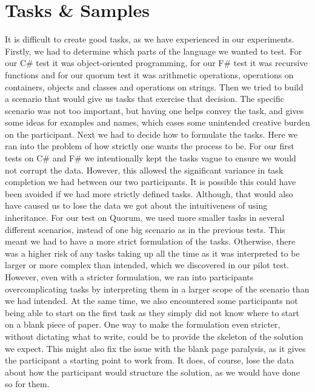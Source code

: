 \section{Tasks \& Samples}
\label{Discussion:TaskSamples}
It is difficult to create good tasks, as we have experienced in our experiments.
Firstly, we had to determine which parts of the language we wanted to test.
For our C\# test it was object-oriented programming, for our F\# test it was recursive functions and for our quorum test it was arithmetic operations, operations on containers, objects and classes and operations on strings.
Then we tried to build a scenario that would give us tasks that exercise that decision.
The specific scenario was not too important, but having one helps convey the task, and gives some ideas for examples and names, which eases some unintended creative burden on the participant.
Next we had to decide how to formulate the tasks.
Here we ran into the problem of how strictly one wants the process to be.
For our first tests on C\# and F\# we intentionally kept the tasks vague to ensure we would not corrupt the data.
However, this allowed the significant variance in task completion we had between our two participants.
It is possible this could have been avoided if we had more strictly defined tasks.
Although, that would also have caused us to lose the data we got about the intuitiveness of using inheritance.
For our test on Quorum, we used more smaller tasks in several different scenarios, instead of one big scenario as in the previous tests.
This meant we had to have a more strict formulation of the tasks.
Otherwise, there was a higher risk of any tasks taking up all the time as it was interpreted to be larger or more complex than intended, which we discovered in our pilot test.
However, even with a stricter formulation, we ran into participants overcomplicating tasks by interpreting them in a larger scope of the scenario than we had intended.
At the same time, we also encountered some participants not being able to start on the first task as they simply did not know where to start on a blank piece of paper.
One way to make the formulation even stricter, without dictating what to write, could be to provide the skeleton of the solution we expect.
This might also fix the issue with the blank page paralysis, as it gives the participant a starting point to work from.
It does, of course, lose the data about how the participant would structure the solution, as we would have done so for them.

